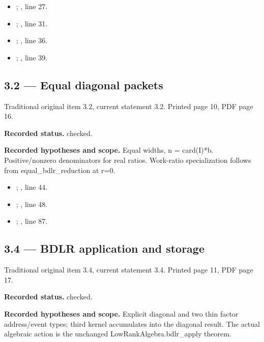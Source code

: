\begin{itemize}
\item {}; , line 27.
\item {}; , line 31.
\item {}; , line 36.
\item {}; , line 39.
\end{itemize}
\subsection{3.2 — Equal diagonal packets}
\label{result:3.2}
{\footnotesize\color{muted}Traditional original item 3.2, current statement 3.2. Printed page 10, PDF page 16.}\par
\textbf{Recorded status.} checked.

\textbf{Recorded hypotheses and scope.} Equal widths, n = card(I)*b. Positive/nonzero denominators for real ratios. Work-ratio specialization follows from equal\_bdlr\_reduction at r=0.

\begin{itemize}
\item {}; , line 44.
\item {}; , line 48.
\item {}; , line 87.
\end{itemize}
\subsection{3.4 — BDLR application and storage}
\label{result:3.4}
{\footnotesize\color{muted}Traditional original item 3.4, current statement 3.4. Printed page 11, PDF page 17.}\par
\textbf{Recorded status.} checked.

\textbf{Recorded hypotheses and scope.} Explicit diagonal and two thin factor address/event types; third kernel accumulates into the diagonal result. The actual algebraic action is the unchanged LowRankAlgebra.bdlr\_apply theorem.

